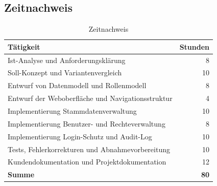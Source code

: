 \subsection{Zeitnachweis}
\label{app:Zeitnachweis}
\begin{table}[htbp]
\centering
\begin{tabular}{|p{9cm}|r|}
\hline
\textbf{Tätigkeit} & \textbf{Stunden} \\
\hline
Ist-Analyse und Anforderungsklärung & 8 \\
\hline
Soll-Konzept und Variantenvergleich & 10 \\
\hline
Entwurf von Datenmodell und Rollenmodell & 8 \\
\hline
Entwurf der Weboberfläche und Navigationsstruktur & 4 \\
\hline
Implementierung Stammdatenverwaltung & 10 \\
\hline
Implementierung Benutzer- und Rechteverwaltung & 8 \\
\hline
Implementierung Login-Schutz und Audit-Log & 10 \\
\hline
Tests, Fehlerkorrekturen und Abnahmevorbereitung & 10 \\
\hline
Kundendokumentation und Projektdokumentation & 12 \\
\hline
\textbf{Summe} & \textbf{80} \\
\hline
\end{tabular}
\caption{Zeitnachweis}
\end{table}
